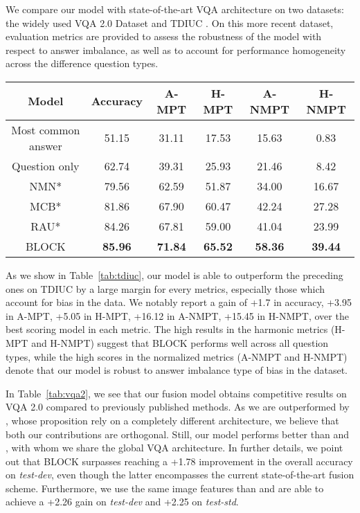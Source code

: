 \documentclass[letterpaper]{article} \usepackage{aaai19}  \usepackage{times}  \usepackage{helvet}  \usepackage{courier}  \usepackage{url}  \usepackage{graphicx}  \usepackage{booktabs}       \usepackage{comment}
\begin{document}
We compare our model with state-of-the-art VQA architecture on two datasets: the widely used VQA 2.0 Dataset \cite{Goyal_2017_CVPR} and TDIUC \cite{Kafle_2017_ICCV}. On this more recent dataset, evaluation metrics are provided to assess the robustness of the model with respect to answer imbalance, as well as to account for performance homogeneity across the difference question types. 

\begin{table*}[t]
    \centering
    \caption{\label{tab:tdiuc} State-of-the-art comparison on the TDIUC testing set. * scores reported from \cite{Kafle_2017_ICCV}.}
    \begin{tabular}{c c c c c c}
        \toprule
        Model & Accuracy & A-MPT & H-MPT & A-NMPT & H-NMPT \\
        \midrule
        Most common answer \cite{Kafle_2017_ICCV} & 51.15 & 31.11 & 17.53 & 15.63 & 0.83 \\
        Question only \cite{Kafle_2017_ICCV} & 62.74 & 39.31 & 25.93 & 21.46 & 8.42 \\
        NMN* \cite{Andreas_2016_CVPR} & 79.56 & 62.59 & 51.87 & 34.00 & 16.67 \\
        MCB* \cite{FukuiPYRDR16} & 81.86 & 67.90 & 60.47 & 42.24 & 27.28 \\
        RAU* \cite{Noh_2016_Arxiv} & 84.26 & 67.81 & 59.00 & 41.04 & 23.99 \\
        \midrule
        BLOCK & \textbf{85.96} & \textbf{71.84} & \textbf{65.52} & \textbf{58.36} & \textbf{39.44} \\
        \bottomrule
    \end{tabular}
\end{table*}

As we show in Table~\ref{tab:tdiuc}, our model is able to outperform the preceding ones on TDIUC by a large margin for every metrics, especially those which account for bias in the data. We notably report a gain of +1.7 in accuracy, +3.95 in A-MPT, +5.05 in H-MPT, +16.12 in A-NMPT, +15.45 in H-NMPT, over the best scoring model in each metric. The high results in the harmonic metrics (H-MPT and H-NMPT) suggest that BLOCK performs well across all question types, while the high scores in the normalized metrics (A-NMPT and H-NMPT) denote that our model is robust to answer imbalance type of bias in the dataset.

In Table~\ref{tab:vqa2}, we see that our fusion model obtains competitive results on VQA 2.0 compared to previously published methods. As we are outperformed by \cite{zhang2018learning}, whose proposition rely on a completely different architecture, we believe that both our contributions are orthogonal. 
Still, our model performs better than \cite{Teney_2018_CVPR} and \cite{yu2018beyond}, with whom we share the global VQA architecture. 
In further details, we point out that BLOCK surpasses \cite{yu2018beyond} reaching a +1.78 improvement in the overall accuracy on \textit{test-dev}, even though the latter encompasses the current state-of-the-art fusion scheme. Furthermore, we use the same image features than \cite{Teney_2018_CVPR} and are able to achieve a +2.26 gain on \textit{test-dev} and +2.25 on \textit{test-std}.
\end{document}
